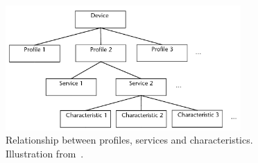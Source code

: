 \begin{figure}[!htb]
\centering
\includegraphics[width=0.8\textwidth]{images/gatt-architecture}
\caption{Relationship between profiles, services and characteristics. Illustration from~\cite[p. 261]{gupta2013inside}.}
\label{fig:analysis:bluetooth:gatt-architecture}
\end{figure}


